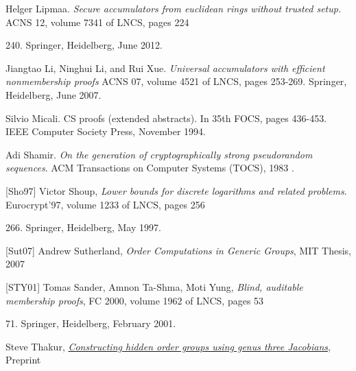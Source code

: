 \documentclass[11pt, lettersize, notitlepage, leqno, footskip=0.6cm]{article}
\newcommand{\noin}{\noindent}
\numberwithin{equation}{section}
\begin{document}
\noin [Lip12] Helger Lipmaa. \textit{Secure accumulators from euclidean rings without trusted setup.} ACNS 12, volume 7341 of LNCS, pages 224{240. Springer, Heidelberg, June 2012.\vspace{0.1cm}

\noin [LLX07] Jiangtao Li, Ninghui Li, and Rui Xue.  \textit{Universal accumulators with efficient nonmembership proofs} ACNS 07, volume 4521 of LNCS, pages 253-269. Springer, Heidelberg, June 2007.\vspace{0.1cm}


\noin [Mic94] Silvio Micali. CS proofs (extended abstracts). In 35th FOCS, pages 436-453. IEEE Computer Society Press, November 1994.\vspace{0.1cm}


\noin [Sha83] Adi Shamir. \textit{On the generation of cryptographically strong pseudorandom
sequences}. ACM Transactions on Computer Systems (TOCS), 1983 \vspace{0.1cm}.

\noin \hypertarget{Sho97}{[Sho97]} Victor Shoup, \textit{Lower bounds for discrete logarithms and related problems}. Eurocrypt'97, volume 1233 of LNCS, pages 256{266. Springer, Heidelberg, May 1997. \vspace{0.1cm}

\noin \hypertarget{Sut07}{[Sut07]} Andrew Sutherland, \textit{Order Computations in Generic Groups}, MIT Thesis, 2007 \vspace{0.1cm}

\noin \hypertarget{STY01}{[STY01]} Tomas Sander, Amnon Ta-Shma, Moti Yung, \textit{Blind, auditable membership proofs}, FC 2000, volume 1962 of LNCS, pages 53{71. Springer, Heidelberg, February 2001.\vspace{0.1cm}


\noin [Th20A] Steve Thakur, \href{https://eprint.iacr.org/2020/348}{\textit{Constructing hidden order groups using genus three Jacobians}}, Preprint \vspace{0.1cm}

}}}
\end{document}
